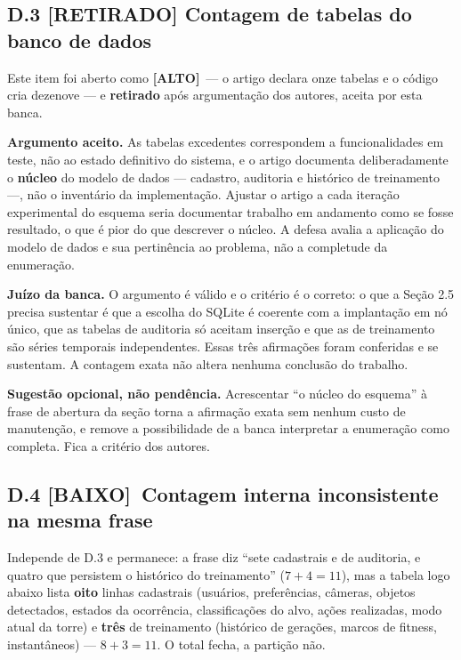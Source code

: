 \documentclass[11pt,a4paper]{article}
\newcommand{\alto}{\textbf{\color{orange!70!black}[ALTO]}}
\newcommand{\baixo}{\textbf{\color{gray}[BAIXO]}}
\begin{document}
\subsection*{D.3 \textbf{[RETIRADO]} Contagem de tabelas do banco de dados}

Este item foi aberto como \alto\ --- o artigo declara onze tabelas e o código cria dezenove --- e
\textbf{retirado} após argumentação dos autores, aceita por esta banca.

\textbf{Argumento aceito.} As tabelas excedentes correspondem a funcionalidades em teste, não ao
estado definitivo do sistema, e o artigo documenta deliberadamente o \textbf{núcleo} do modelo de
dados --- cadastro, auditoria e histórico de treinamento ---, não o inventário da implementação.
Ajustar o artigo a cada iteração experimental do esquema seria documentar trabalho em andamento como
se fosse resultado, o que é pior do que descrever o núcleo. A defesa avalia a aplicação do modelo de
dados e sua pertinência ao problema, não a completude da enumeração.

\textbf{Juízo da banca.} O argumento é válido e o critério é o correto: o que a Seção 2.5 precisa
sustentar é que a escolha do SQLite é coerente com a implantação em nó único, que as tabelas de
auditoria só aceitam inserção e que as de treinamento são séries temporais independentes. Essas três
afirmações foram conferidas e se sustentam. A contagem exata não altera nenhuma conclusão do
trabalho.

\textbf{Sugestão opcional, não pendência.} Acrescentar ``o núcleo do esquema'' à frase de abertura da
seção torna a afirmação exata sem nenhum custo de manutenção, e remove a possibilidade de a banca
interpretar a enumeração como completa. Fica a critério dos autores.

\subsection*{D.4 \baixo\ Contagem interna inconsistente na mesma frase}

Independe de D.3 e permanece: a frase diz ``sete cadastrais e de auditoria, e quatro que persistem o
histórico do treinamento'' ($7+4=11$), mas a tabela logo abaixo lista \textbf{oito} linhas cadastrais
(usuários, preferências, câmeras, objetos detectados, estados da ocorrência, classificações do alvo,
ações realizadas, modo atual da torre) e \textbf{três} de treinamento (histórico de gerações, marcos
de fitness, instantâneos) --- $8+3=11$. O total fecha, a partição não.
\end{document}
